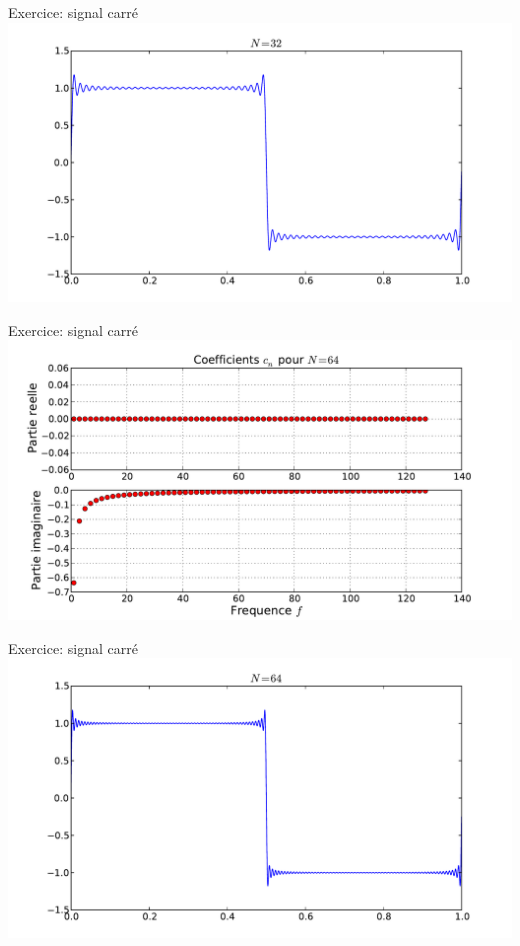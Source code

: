\documentclass[8pt,a4paper]{beamer}
\begin{document}
\begin{frame}{Exercice: signal carré}
\includegraphics[width=1.\textwidth]{figures/serieF_carre_32.pdf}\\
\end{frame}

\begin{frame}{Exercice: signal carré}
\includegraphics[width=1.\textwidth]{figures/serieF_carre_c_64.pdf} \\
\end{frame}

\begin{frame}{Exercice: signal carré}
\includegraphics[width=1.\textwidth]{figures/serieF_carre_64.pdf}\\
\end{frame}
\end{document}
